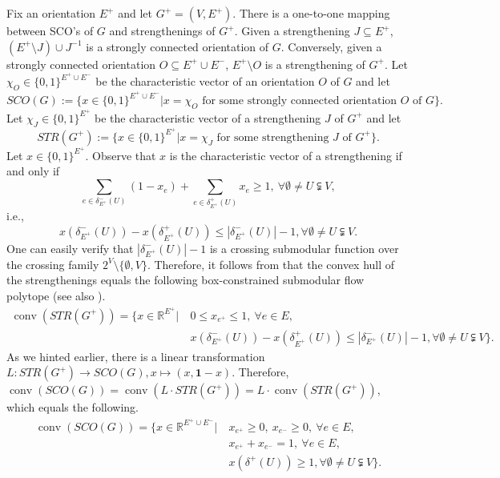 \documentclass[runningheads]{llncs}
\DeclareMathOperator{\conv}{conv}
\begin{document}
Fix an orientation $E^+$ and let $G^+=(V,E^+)$. There is a one-to-one mapping between SCO's of $G$ and strengthenings of $G^+$. Given a strengthening $J\subseteq E^+$, $(E^+\setminus J)\cup J^{-1}$ is a strongly connected orientation of $G$. Conversely, given a strongly connected orientation $O\subseteq E^+\cup E^-$, $E^+\setminus O$ is a strengthening of $G^+$.
Let $\chi_O\in \{0,1\}^{E^+\cup E^-}$ be the characteristic vector of an orientation $O$ of $G$ and let
     \[
        SCO(G):=\big\{x\in\{0,1\}^{E^+\cup E^-}\big|x=\chi_O \text{ for some strongly connected orientation $O$ of $G$}\big\}.
    \]
    Let $\chi_J\in \{0,1\}^{E^+}$ be the characteristic vector of a strengthening $J$ of $G^+$ and let
    \[
        STR(G^+):=\big\{x\in\{0,1\}^{E^+}\big|x=\chi_J \text{ for some strengthening $J$ of $G^+$}\big\}.
\]
Let $x\in\{0,1\}^{E^+}$. Observe that $x$ is the characteristic vector of a strengthening if and only if
\[\sum_{e\in \delta_{E^+}^-(U)} (1-x_e)+ \sum_{e\in \delta_{E^+}^+(U)} x_e \geq 1,\ \forall \emptyset \neq U\subsetneqq V,
\]
i.e.,
\[
x(\delta_{E^+}^-(U))-x(\delta_{E^+}^+(U))\leq |\delta_{E^+}^-(U)|-1, \forall \emptyset \neq U\subsetneqq V.
\]
One can easily verify that $|\delta_{E^+}^-(U)|-1$ is a crossing submodular function over the crossing family $2^V\setminus \{\emptyset, V\}$. Therefore, it follows from  that the convex hull of the strengthenings equals the following box-constrained submodular flow polytope (see also \cite{abdi2024arc}).
\begin{equation*}
    \begin{aligned}
        \conv(STR(G^+))=\big\{x\in\mathbb{R}^{E^+}\big|~&0\leq x_{e^+}\leq 1,~\forall e\in E,\\
        &x(\delta_{E^+}^-(U))-x(\delta_{E^+}^+(U))\leq |\delta_{E^+}^-(U)|-1, \forall \emptyset \neq U\subsetneqq V\big\}.
    \end{aligned}
\end{equation*}
As we hinted earlier, there is a linear transformation $L:STR(G^+)\rightarrow SCO(G), x\mapsto (x,\mathbf{1}-x)$. Therefore, $\conv(SCO(G))=\conv(L\cdot STR(G^+))=L\cdot\conv(STR(G^+))$, which equals the following.
    \begin{equation*}
    \begin{aligned}
        \conv(SCO(G))=\big\{x\in\mathbb{R}^{E^+\cup E^-}\big|~&x_{e^+}\geq 0,~ x_{e^-}\geq 0, ~\forall e\in E,\\
        &x_{e^+}+x_{e^-}=1,~\forall e\in E,\\
        &x(\delta^+(U))\geq 1, \forall \emptyset \neq U\subsetneqq V\big\}.
    \end{aligned}
    \end{equation*}
\end{document}
